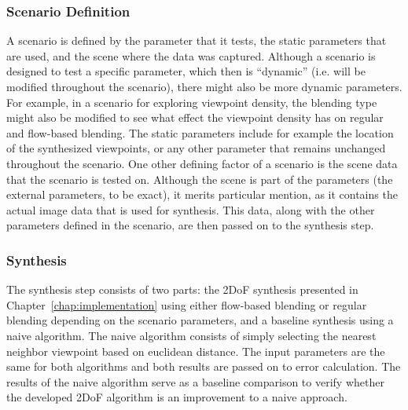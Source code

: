 \subsubsection{Scenario Definition}
A scenario is defined by the parameter that it tests, the static parameters that are used, and the scene where the data was captured. Although a scenario is designed to test a specific parameter, which then is ``dynamic'' (i.e. will be modified throughout the scenario), there might also be more dynamic parameters. For example, in a scenario for exploring viewpoint density, the blending type might also be modified to see what effect the viewpoint density has on regular and flow-based blending. The static parameters include for example the location of the synthesized viewpoints, or any other parameter that remains unchanged throughout the scenario. One other defining factor of a scenario is the scene data that the scenario is tested on. Although the scene is part of the parameters (the external parameters, to be exact), it merits particular mention, as it contains the actual image data that is used for synthesis. This data, along with the other parameters defined in the scenario, are then passed on to the synthesis step.



\subsubsection{Synthesis}
The synthesis step consists of two parts: the 2DoF synthesis presented in Chapter~\ref{chap:implementation} using either flow-based blending or regular blending depending on the scenario parameters, and a baseline synthesis using a naive algorithm.
The naive algorithm consists of simply selecting the nearest neighbor viewpoint based on euclidean distance. The input parameters are the same for both algorithms and both results are passed on to error calculation.
The results of the naive algorithm serve as a baseline comparison to verify whether the developed 2DoF algorithm is an improvement to a naive approach.

